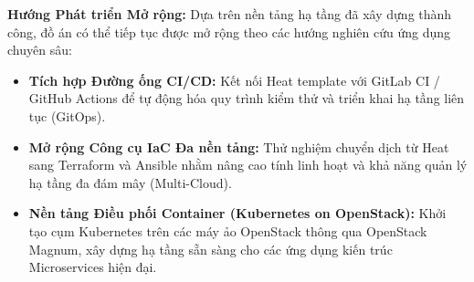 \noindent \textbf{Hướng Phát triển Mở rộng:}
Dựa trên nền tảng hạ tầng đã xây dựng thành công, đồ án có thể tiếp tục được mở rộng theo các hướng nghiên cứu ứng dụng chuyên sâu:
\begin{itemize}
    \item \textbf{Tích hợp Đường ống CI/CD:} Kết nối Heat template với GitLab CI / GitHub Actions để tự động hóa quy trình kiểm thử và triển khai hạ tầng liên tục (GitOps).
    \item \textbf{Mở rộng Công cụ IaC Đa nền tảng:} Thử nghiệm chuyển dịch từ Heat sang Terraform và Ansible nhằm nâng cao tính linh hoạt và khả năng quản lý hạ tầng đa đám mây (Multi-Cloud).
    \item \textbf{Nền tảng Điều phối Container (Kubernetes on OpenStack):} Khởi tạo cụm Kubernetes trên các máy ảo OpenStack thông qua OpenStack Magnum, xây dựng hạ tầng sẵn sàng cho các ứng dụng kiến trúc Microservices hiện đại.
\end{itemize}
